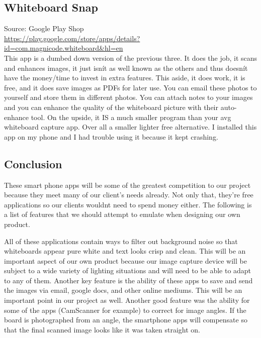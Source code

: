 \documentclass{article}
\begin{document}
				\subsection*{Whiteboard Snap}
Source: Google Play Shop\\
{\color{red} \url{https://play.google.com/store/apps/details?id=com.magnicode.whiteboard&hl=en}} \\
					
This app is a dumbed down version of the previous three. It does the job, it scans and enhances images, it just isnít as well known as the others and thus doesnít have the money/time to invest in extra features. This aside, it does work, it is free, and it does save images as PDFs for later use. You can email these photos to yourself and store them in different photos. You can attach notes to your images and you can enhance the quality of the whiteboard picture with their auto-enhance tool. On the upside, it IS a much smaller program than your avg whiteboard capture app. Over all a smaller lighter free alternative. I installed this app on my phone and I had trouble using it because it kept crashing. \\

     \subsection*{Conclusion}
These smart phone apps will be some of the greatest competition to our project because they meet many of our client's needs already. Not only that, they're free applications so our clients wouldnt need to spend money either. The following is a list of features that we should attempt to emulate when designing our own product.

All of these applications contain ways to filter out background noise so that whiteboards appear pure white and text looks crisp and clean. This will be an important aspect of our own product because our image capture device will be subject to a wide variety of lighting situations and will need to be able to adapt to any of them.
Another key feature is the ability of these apps to save and send the images via email, google docs, and other online mediums. This will be an important point in our project as well.
Another good feature was the ability for some of the apps (CamScanner for example) to correct for image angles. If the board is photographed from an angle, the smartphone apps will compensate so that the final scanned image looks like it was taken straight on. \\
\end{document}
